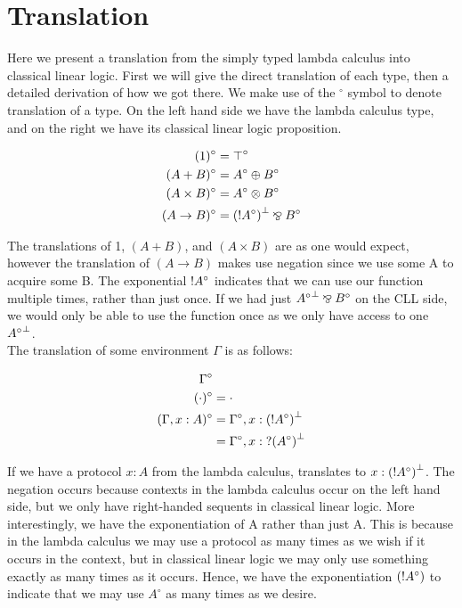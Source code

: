 \chapter{Translation}

Here we present a translation from the simply typed lambda calculus into classical linear logic. First 
we will give the direct translation of each type, then a detailed derivation of how we got there. We 
make use of the $^{\circ}$ symbol to denote translation of a type. On the left hand side we have the lambda 
calculus type, and on the right we have its classical linear logic proposition.

\begin{align*}
    (1)^\circ &= \top^\circ \\
    (A + B)^\circ &= A^\circ \oplus B^\circ \\
    (A \times B)^\circ &= A^\circ \otimes B^\circ \\
    (A \rightarrow B)^\circ &= \negg{(\ofc A^\circ)} \parr B^\circ
\end{align*} 

\noindent
The translations of 1, $(A + B)$, and $(A \times B)$ are as one would expect, however the translation 
of $(A \rightarrow B)$ makes use negation since we use some A to acquire some B. The exponential $\textrm{!} A^\circ$ 
indicates that we can use our function multiple times, rather than just once. If we had just 
$\negg{A^\circ} \parr B^\circ$ on the CLL side, we would only be able to use the function once as we 
only have access to one $\negg{A^\circ}$. \\

\noindent
The translation of some environment $\Gamma$ is as follows:

\begin{align*}
  \Gamma^\circ & \\
  (\cdot)^\circ &= \cdot \\
  (\Gamma, x:A)^\circ &= \Gamma^\circ, x: \negg{(\ofc A^\circ)} \\
   &= \Gamma^\circ, x: \whynot \negg{(A^\circ)}
\end{align*} 

\noindent
If we have a protocol $x:A$ from the lambda calculus, translates to $x: \negg{(\ofc A^\circ)}$. The negation 
occurs because contexts in the lambda calculus occur on the left hand side, but we only have right-handed 
sequents in classical linear logic. More interestingly, we have the exponentiation of A rather than just A. 
This is because in the lambda calculus we may use a protocol as many times as we wish if it occurs in the 
context, but in classical linear logic we may only use something exactly as many times as it occurs. Hence, 
we have the exponentiation $(\textrm{!} A^\circ)$ to indicate that we may use $A^\circ$ as many times as we desire. \\

